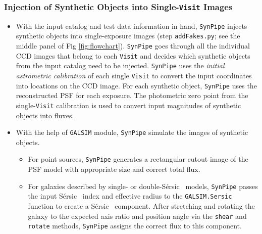 \documentclass[useamsfonts]{pasj01}
\def\ser{{S\'{e}rsic\ }}
\def\synpipe{\texttt{SynPipe}}
\def\visit{\texttt{Visit}}
\def\galsim{\texttt{G}{\scriptsize \texttt{AL}}\texttt{S}{\scriptsize \texttt{IM}}}
\begin{document}

\subsubsection{Injection of Synthetic Objects into Single-\visit{} Images}
    \label{sssec:addFakes}
    
    \begin{itemize}
    
        \item With the input catalog and test data information in hand, \synpipe{} 
            injects synthetic objects into single-exposure images (step
            \texttt{addFakes.py}; see the middle panel of Fig \ref{fig:flowchart}).
            \synpipe{} goes through all the individual CCD images that belong to 
            each \visit{} and decides which synthetic objects from the input catalog 
            need to be injected. 
            \synpipe{} uses the \textit{initial astrometric calibration} of each 
            single \visit{} to convert the input coordinates into locations on the 
            CCD image. 
            For each synthetic object, \synpipe{} uses the reconstructed PSF for each 
            exposure.  
            The photometric zero point from the single-\visit{} calibration is used
            to convert input magnitudes of synthetic objects into fluxes.
    
        \item With the help of \galsim{} module, \synpipe{} simulate the images of
            synthetic objects.
            \begin{itemize}
            
            \item For point sources, \synpipe{} generates a rectangular cutout image 
                of the PSF model with appropriate size and correct total flux. 
            
            \item For galaxies described by single- or double-\ser{} models, 
                \synpipe{} passes the input \ser{} index and effective radius to 
                the \galsim{}\texttt{.Sersic} function to create a \ser{} component.
                After stretching and rotating the galaxy to the expected axis ratio 
                and position angle via the \texttt{shear} and \texttt{rotate} methods,
                \synpipe{} assigns the correct flux to this component.
            

\end{itemize}
\end{itemize}
\end{document}
